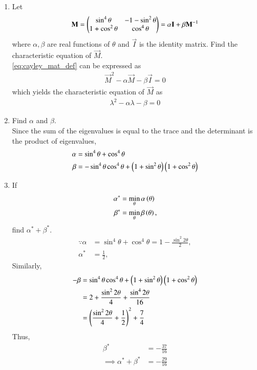 \renewcommand{\theequation}{\theenumi}
\begin{enumerate}[label=\arabic*.,ref=\thesubsection.\theenumi]

\item Let
\begin{align}
\label{eq:cayley_mat_def}
\mathbf{M} = \begin{pmatrix}\sin^4\theta & -1-\sin^2\theta \\ 1+ \cos^2\theta & \cos^4\theta\end{pmatrix} = \alpha\mathbf{I} + \beta \mathbf{M}^{-1}
\end{align}
where $\alpha, \beta$ are real functions of $\theta$ and $\vec{I}$ is the identity matrix. Find the characteristic equation of $\vec{M}$.
\\
\solution \eqref{eq:cayley_mat_def} can be expressed as
\begin{align}
\vec{M}^2 -\alpha\vec{M} - \beta \vec{I} = 0
\end{align}
%
which yields   the characteristic equation of $\vec{M}$ as
\begin{align}
\lambda^2 -\alpha\lambda - \beta  = 0
\end{align}
\item Find $\alpha$ and $\beta$.
\\
\solution
Since the sum of the eigenvalues is equal to the trace and the determinant is the product of eigenvalues,
\begin{align}
 \alpha &= \sin^4\theta + \cos^4\theta 
\\
  \beta & = -\sin^4\theta \cos^4\theta + \left(1+\sin^2\theta\right)\left( 1+ \cos^2\theta\right)
\end{align}
\item If 
\begin{align}
\alpha^{*} &= \min_{\theta}\alpha\left(\theta\right)
\\
\beta^{*} &= \min_{\theta}\beta\left(\theta\right), 
\end{align}
find $\alpha^{*} + \beta^{*}$.
\\
\solution 
\begin{align}
\because  \alpha &= \sin^4\theta + \cos^4\theta = 1 - \frac{\sin^2 2\theta}{2},
\\
\alpha^{*} &= \frac{1}{2}, 
\end{align}
Similarly,
\begin{align}
 - \beta & = \sin^4\theta \cos^4\theta + \left(1+\sin^2\theta\right)\left( 1+ \cos^2\theta\right)
\\
&=2 + \frac{\sin^2 2\theta}{4} + \frac{\sin^4 2\theta}{16}
\\
&= \left(\frac{\sin^2 2\theta}{4}+\frac{1}{2}\right)^2+ \frac{7}{4} 
\end{align}
Thus,
\begin{align}
 \beta^{*} &= -\frac{37}{16}
\\
\implies \alpha^{*}+\beta^{*} &= -\frac{29}{16}
\end{align}
\end{enumerate}
